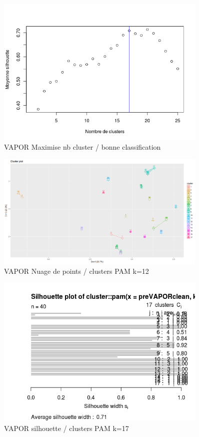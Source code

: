 %
%

\begin{figure}[H]
\centering
\includegraphics[width=0.90\textwidth]{../Fig/VAPOR/vapor-elbow-pre.png}
\caption{VAPOR Maximise nb cluster / bonne classification}
\end{figure}

\begin{figure}[H]
\centering
\includegraphics[width=0.90\textwidth]{../Fig/VAPOR/vapor-pam-k17.png}
\caption{VAPOR Nuage de points / clusters PAM k=12 }
\end{figure}

\begin{figure}[H]
\centering
\includegraphics[width=0.90\textwidth]{../Fig/VAPOR/vapor-sil-pre.png}
\caption{VAPOR silhouette / clusters PAM k=17 }
\end{figure}

